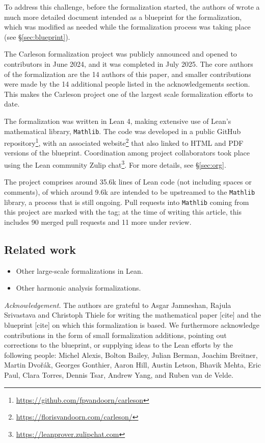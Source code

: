 \documentclass[12pt]{amsart}
\newcommand{\mathlib}{\texttt{Mathlib}\xspace}
\theoremstyle{definition}
\theoremstyle{plain}
\begin{document}
To address this challenge, before the formalization started, the authors of \cite{ThieleCarlesonPreprint} wrote a much more detailed document \cite{CarlesonBlueprint} intended as a blueprint for the formalization, which was modified as needed while the formalization process was taking place (see \S\ref{sec:blueprint}).

The Carleson formalization project was publicly announced and opened to contributors in June 2024, and it was completed in July 2025. The core authors of the formalization are the 14 authors of this paper, and smaller contributions were made by the 14 additional people listed in the acknowledgements section. This makes the Carleson project one of the largest scale formalization efforts to date.

The formalization was written in Lean 4, making extensive use of Lean's mathematical library, \mathlib. The code was developed in a public GitHub repository\footnote{\url{https://github.com/fpvandoorn/carleson}}, with an associated website\footnote{\url{https://florisvandoorn.com/carleson/}} that also linked to HTML and PDF versions of the blueprint. Coordination among project collaborators took place using the Lean community Zulip chat\footnote{\url{https://leanprover.zulipchat.com}}. For more details, see \S\ref{sec:org}.

The project comprises around 35.6k lines of Lean code (not including spaces or comments), of which around 9.6k are intended to be upstreamed to the \mathlib library, a process that is still ongoing. Pull requests into \mathlib coming from this project are marked with the  tag; at the time of writing this article, this includes 90 merged pull requests and 11 more under review.

\subsection{Related work}\label{subsec:rel_work}
\begin{itemize}
 	\item Other large-scale formalizations in Lean.
	\item Other harmonic analysis formalizations.
\end{itemize}

\noindent \textit{Acknowledgement.}
The authors are grateful to Asgar Jamneshan, Rajula Srivastava and Christoph Thiele for writing the mathematical paper [cite] and the blueprint [cite] on which this formalization is based.
We furthermore acknowledge contributions in the form of small formalization additions,
pointing out corrections to the blueprint,
or supplying ideas to the Lean efforts by the following people:
Michel Alexis,
Bolton Bailey,
Julian Berman,
Joachim Breitner,
Martin Dvořák,
Georges Gonthier,
Aaron Hill,
Austin Letson,
Bhavik Mehta,
Eric Paul,
Clara Torres,
Dennis Tsar,
Andrew Yang, and
Ruben van de Velde.
\end{document}
